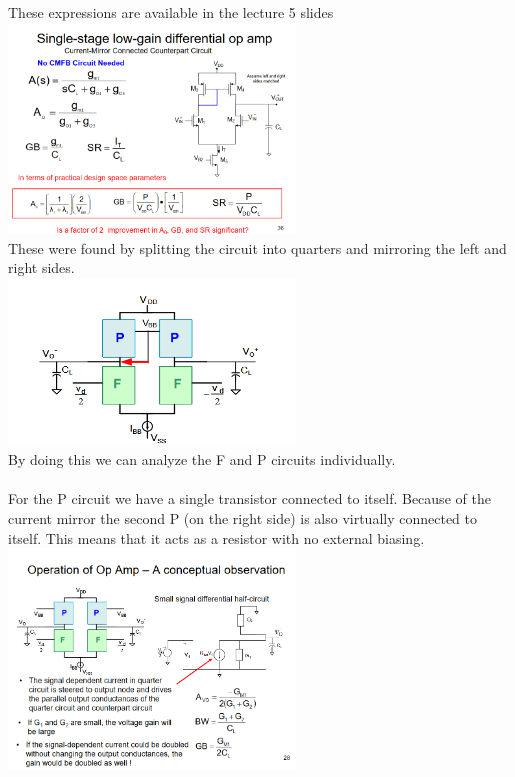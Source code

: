 \documentclass[10pt,a4paper]{article}
\begin{document}
These expressions are available in the lecture 5 slides\\
\includegraphics[width=3in]{images/Lecture5Slide.png} \\

These were found by splitting the circuit into quarters and mirroring the left and right sides.\\
\includegraphics[width=3in]{images/Mirror.png} \\
By doing this we can analyze the F and P circuits individually.\\
\\
For the P circuit we have a single transistor connected to itself. Because of the current mirror the second P (on the right side) is also virtually connected to itself. This means that it acts as a resistor with no external biasing.\\
\includegraphics[width=3in]{images/Lecture5Slide28.png} \\
\end{document}
